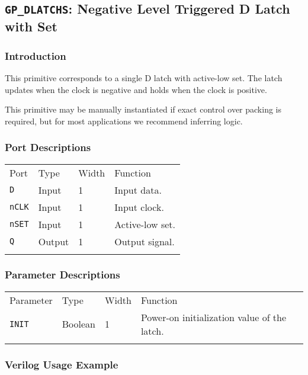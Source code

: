 \documentclass[11pt]{article}
\newcommand{\tokenstyle}[1]{\texttt{#1}}
\newcommand{\whenstyle}[1]{{\fontseries{sb}\selectfont#1}}
\newcommand{\thinhline}{\Xhline{1\arrayrulewidth}}
\newcommand{\thickhline}{\Xhline{2.5\arrayrulewidth}}
\begin{document}
\subsection{\tokenstyle{GP\_DLATCHS}: Negative Level Triggered D Latch with Set}
\label{gp-latchs}

\subsubsection{Introduction}
This primitive corresponds to a single D latch with active-low set. The latch updates when the clock is negative and holds 
when the clock is positive.

This primitive may be manually instantiated if exact control over packing is required, but for most applications we
recommend inferring logic.

\subsubsection{Port Descriptions}

\begin{tabularx}{\textwidth}{lllX}
\thinhline
\whenstyle{Port} & \whenstyle{Type} & \whenstyle{Width} & \whenstyle{Function} \\
\thickhline
\tokenstyle{D} & Input & 1 & Input data. \\
\thinhline
\tokenstyle{nCLK} & Input & 1 & Input clock. \\
\thinhline
\tokenstyle{nSET} & Input & 1 & Active-low set. \\
\thinhline
\tokenstyle{Q} & Output & 1 & Output signal. \\
\thinhline
\end{tabularx}

\subsubsection{Parameter Descriptions}

\begin{tabularx}{\textwidth}{lllX}
\thinhline
\whenstyle{Parameter} & \whenstyle{Type} & \whenstyle{Width} & \whenstyle{Function} \\
\thickhline
\tokenstyle{INIT} & Boolean & 1 & Power-on initialization value of the latch.\\
\thinhline
\end{tabularx}

\subsubsection{Verilog Usage Example}
\end{document}
